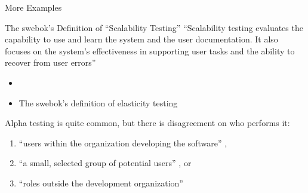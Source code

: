 \documentclass[22pt]{beamer}
\begin{document}
\begin{frame}[fragile]
\begin{textblock}{7.25}
\begin{block}{\fontsize{37}{20}\selectfont More Examples}
            \quad\\ %

            \begin{center}
                \begin{minipage}{.9\textwidth}
                    \begin{exampleblock}{The \acs{swebok}'s Definition of
                            ``Scalability Testing''}
                        {\fontsize{28}{13}\selectfont
                            ``Scalability testing evaluates the capability to
                            use and learn the system and the user documentation.
                            It also focuses on the system's effectiveness in
                            supporting user tasks and the ability to recover
                            from user errors'' \cite[p.~5-9]{SWEBOK2024}}
                    \end{exampleblock}
                \end{minipage}
            \end{center}

            \begin{itemize}
                \item \swebokScalDef{}
                \item The \acs{swebok}'s definition of elasticity testing
                      \cite[p.~5-9]{SWEBOK2024} \swebokElasRef{}
            \end{itemize}

            \vspace{5mm}

            Alpha testing is quite common, but there is disagreement on who
            performs it:
            \begin{enumerate}
                \item ``users within the organization developing the software''
                      \cite[p.~17]{IEEE2017},
                \item ``a small, selected group of potential users''
                      \cite[p.~5-8]{SWEBOK2024}, or
                \item ``roles outside the development organization''
                      \cite{ISTQB_poster}
            \end{enumerate}
            \vspace{5mm}
        \end{block}


\end{textblock}
\end{frame}
\end{document}
